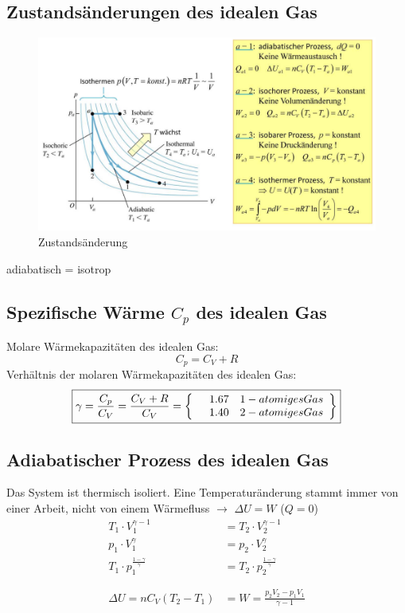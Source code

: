 \newpage

\subsection{Zustandsänderungen des idealen Gas}
\begin{figure}[h!]
	\begin{center}
		\leavevmode
		\includegraphics[scale=0.42, trim = 0mm 0mm 0mm 0mm, clip]{../fig/zustandsaenderung.png}
		\caption{Zustandsänderung}
	\end{center}
\end{figure}
adiabatisch = isotrop
\\

\subsection{Spezifische Wärme $C_p$ des idealen Gas}
Molare Wärmekapazitäten des idealen Gas:
\[\boxed{
	C_p=C_V+R
}\]
Verhältnis der molaren Wärmekapazitäten des idealen Gas:
\[\boxed{
	\gamma = \frac{C_p}{C_V}=\frac{C_V+R}{C_V}=
	\begin{aligned}
		\left\{
		\begin{array}{l l}
			& 1.67 \quad  1-atomiges Gas  \\ 
			& 1.40 \quad  2-atomiges Gas
		\end{array}
		\right\}
	\end{aligned}
}\]

\subsection{Adiabatischer Prozess des idealen Gas}
Das System ist thermisch isoliert. Eine Temperaturänderung stammt immer von einer Arbeit, nicht von einem Wärmefluss $\rightarrow$ $\Delta U=W$ ($Q=0$)
\\
\[\boxed{
	\begin{aligned}
	T_1\cdot V_1^{\gamma-1} &= T_2\cdot V_2^{\gamma-1}\\ 
	p_1\cdot V_1^{\gamma} &= p_2\cdot V_2^{\gamma} \\
	T_1\cdotp p_1^{\frac{1-\gamma}{\gamma}} &= T_2\cdot p_2^{\frac{1-\gamma}{\gamma}}\\
	\\\\
	\Delta U=nC_V(T_2-T_1)&=W=\frac{p_2V_2-p_1V_1}{\gamma-1}
	\end{aligned}	
}\]

